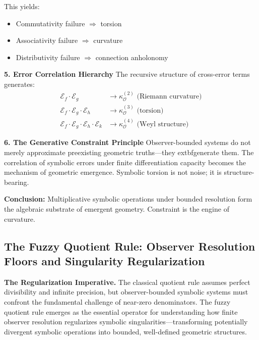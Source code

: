 \begin{scholium}
This yields:
\begin{itemize}
    \item Commutativity failure $\Rightarrow$ torsion
    \item Associativity failure $\Rightarrow$ curvature
    \item Distributivity failure $\Rightarrow$ connection anholonomy
\end{itemize}

\textbf{5. Error Correlation Hierarchy}
The recursive structure of cross-error terms generates:
\begin{align*}
    \mathcal{E}_f \cdot \mathcal{E}_g &\rightarrow \kappa_{\mathcal{O}}^{(2)} \text{ (Riemann curvature)} \\
    \mathcal{E}_f \cdot \mathcal{E}_g \cdot \mathcal{E}_h &\rightarrow \kappa_{\mathcal{O}}^{(3)} \text{ (torsion)} \\
    \mathcal{E}_f \cdot \mathcal{E}_g \cdot \mathcal{E}_h \cdot \mathcal{E}_k &\rightarrow \kappa_{\mathcal{O}}^{(4)} \text{ (Weyl structure)}
\end{align*}

\textbf{6. The Generative Constraint Principle}
Observer-bounded systems do not merely approximate preexisting geometric truths---they 	extbf{generate} them. The correlation of symbolic errors under finite differentiation capacity becomes the mechanism of geometric emergence. Symbolic torsion is not noise; it is structure-bearing.

\textbf{Conclusion:} Multiplicative symbolic operations under bounded resolution form the algebraic substrate of emergent geometry. Constraint is the engine of curvature.

\end{scholium}


\subsection{The Fuzzy Quotient Rule: Observer Resolution Floors and Singularity Regularization}
\label{subsec:bk4_fuzzy_quotient_rule}

\textbf{The Regularization Imperative.} The classical quotient rule assumes perfect divisibility and infinite precision, but observer-bounded symbolic systems must confront the fundamental challenge of near-zero denominators. The fuzzy quotient rule emerges as the essential operator for understanding how finite observer resolution regularizes symbolic singularities---transforming potentially divergent symbolic operations into bounded, well-defined geometric structures.

